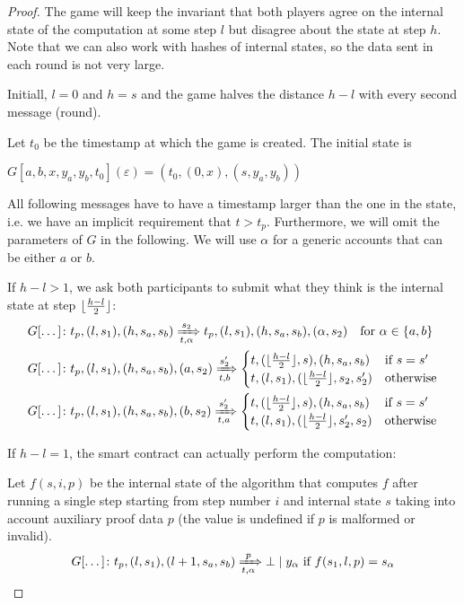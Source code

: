 \documentclass[11pt,letterpaper]{article}
\DeclarePairedDelimiter\floor{\lfloor}{\rfloor}
\begin{document}
\begin{proof}
The game will keep the invariant that both players agree on the internal state of
the computation at some step $l$ but disagree about the state at step $h$.
Note that we can also work with hashes of internal states, so the data sent in each
round is not very large.

Initiall, $l=0$ and $h=s$ and the game halves the distance $h-l$ with every
second message (round).

Let $t_0$ be the timestamp at which the game is created. The initial state is

$G[a,b,x,y_a,y_b,t_0](\varepsilon) = (t_0, (0, x), (s, y_a, y_b))$

All following messages have to have a timestamp larger than the one in the state, i.e.
we have an implicit requirement that $t > t_p$.
Furthermore, we will omit the parameters of $G$ in the following. We will use
$\alpha$ for a generic accounts that can be either $a$ or $b$.

If $h - l > 1$, we ask both participants to submit what they think is the
internal state at step $\floor{\frac{h-l}{2}}$:
\begin{align}
&G[\dots]\colon
  t_p, (l, s_1), (h, s_a, s_b)
  \xRightarrow[t, \alpha]{s_2}
  t_p, (l, s_1), (h, s_a, s_b), (\alpha, s_2)
  \text{\quad for $\alpha \in \{a,b\}$}\label{eq_provide}\\
&G[\dots]\colon
  t_p, (l, s_1), (h, s_a, s_b), (a, s_2)
  \xRightarrow[t, b]{s_2'}
  \begin{cases}
    t, (\floor{\frac{h-l}{2}}, s), (h, s_a, s_b) & \text{if }s = s'\\
    t, (l, s_1), (\floor{\frac{h-l}{2}}, s_2, s_2') & \text{otherwise}\\
\end{cases}\label{eq_responda}\\
&G[\dots]\colon
  t_p, (l, s_1), (h, s_a, s_b), (b, s_2)
  \xRightarrow[t, a]{s_2'}
  \begin{cases}
    t, (\floor{\frac{h-l}{2}}, s), (h, s_a, s_b) & \text{if }s = s'\\
    t, (l, s_1), (\floor{\frac{h-l}{2}}, s_2', s_2) & \text{otherwise}\\
\end{cases}\label{eq_respondb}
\end{align}

If $h-l = 1$, the smart contract can actually perform the computation:

Let $f(s,i,p)$ be the internal state of the algorithm that computes $f$
after running a single step starting from step number $i$ and internal
state $s$ taking into account auxiliary proof data $p$ (the value
is undefined if $p$ is malformed or invalid).
\begin{align}
G[\dots]\colon t_p, (l, s_1), (l+1, s_a, s_b) \xRightarrow[t, \alpha]{p}
\bot \mid y_\alpha \text{ if } f(s_1,l,p) = s_\alpha\label{eq_final}
\end{align}


\end{proof}
\end{document}

